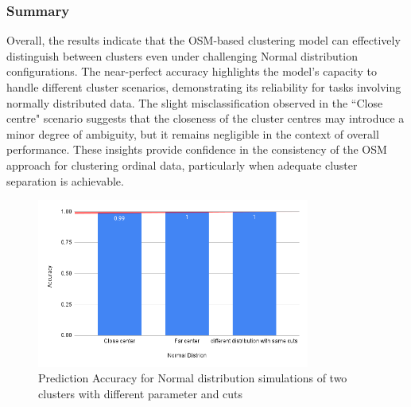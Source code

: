 \documentclass{article}
\begin{document}
\subsubsection*{Summary}

Overall, the results indicate that the OSM-based clustering model can effectively distinguish between clusters even under challenging Normal distribution configurations. 
The near-perfect accuracy highlights the model's capacity to handle different cluster scenarios, demonstrating its reliability for tasks involving normally distributed data. 
The slight misclassification observed in the ``Close centre" scenario suggests that the closeness of the cluster centres may introduce a minor degree of ambiguity, but it remains negligible in the context of overall performance. 
These insights provide confidence in the consistency of the OSM approach for clustering ordinal data, particularly when adequate cluster separation is achievable.

\begin{figure}[htbp!]
  \centering
  \includegraphics[width=0.8\textwidth]{images/experiments/norm_dist.png}
  \caption{Prediction Accuracy for Normal distribution simulations of two clusters with different parameter and cuts}
  \label{fig:dist_acc}
\end{figure}
\end{document}

